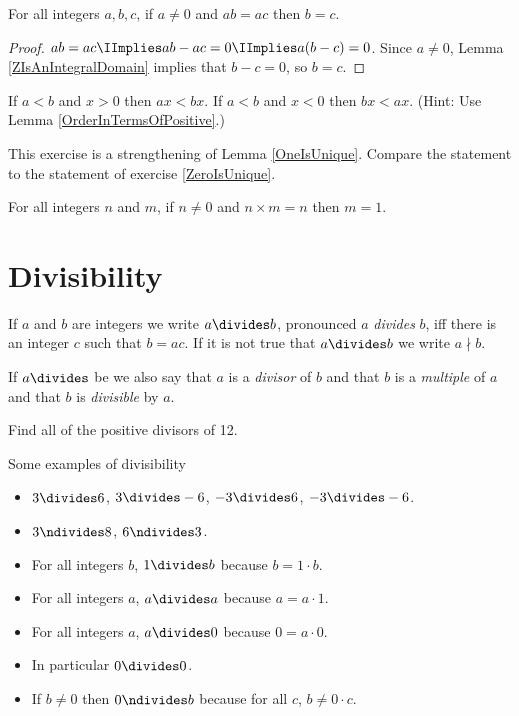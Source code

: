 \documentclass[oneside,12pt]{amsart}
\begin{document}
\begin{lemma}
\label{CancellationLaw}
For all integers $a,b,c$, if $a\not=0$
and $ab = ac$ then $b=c$.
\end{lemma}
\begin{proof}
$ab=ac\IImplies ab-ac=0 \IImplies a(b-c) = 0$. Since $a\not=0$, Lemma
\ref{ZIsAnIntegralDomain} implies that $b-c=0$, so $b=c$.
\end{proof}

\begin{homework}
If $a<b$ and $x>0$ then $ax < bx$.
If $a<b$ and $x<0$ then $bx < ax$.
(Hint: Use Lemma \ref{OrderInTermsOfPositive}.)
\end{homework}

This exercise is a strengthening of Lemma \ref{OneIsUnique}. Compare the statement
to the statement of exercise \ref{ZeroIsUnique}.
\begin{homework}
\label{StrongerOneIsUnique}
For all integers $n$ and $m$, if $n\not=0$
and $n\times m=n$ then $m=1$.
\end{homework}

\section{Divisibility}

\begin{definition}
If $a$ and $b$ are integers we write $a\divides b$, pronounced $a$ \emph{divides}
$b$, iff there is an integer $c$ such that $b=ac$. If it is not true that
$a\divides b$ we write $a\nmid b$.

If $a\divides$ be we also say that $a$ is a \emph{divisor} of $b$ and that
$b$ is a \emph{multiple} of $a$ and that $b$ is \emph{divisible} by $a$.
\end{definition}

\begin{in_class_example}
Find all of the positive divisors of 12.
\end{in_class_example}


\begin{numbered_example}
Some examples of divisibility
\begin{itemize}
\item $3\divides 6$, $3\divides -6$, $-3\divides 6$, $-3\divides -6$.
\item $3 \ndivides 8$, $6\ndivides 3$.
\item For all integers $b$, $1\divides b$ because $b = 1\cdot b$.
\item For all integers $a$, $a\divides a$ because $a = a\cdot 1$.
\item For all integers $a$, $a\divides 0$ because $0 = a\cdot 0$.
\item In particular $0\divides 0$.
\item If $b\not=0$ then $0\ndivides b$ because for all $c$, $b\not=0\cdot c$.
\end{itemize}

\end{numbered_example}
\end{document}
